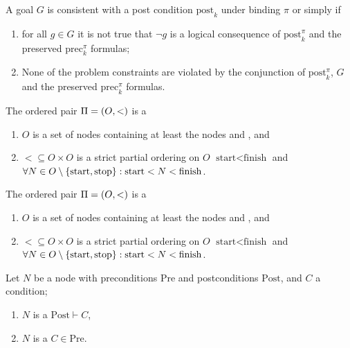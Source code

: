 \begin{defi}
A goal $G$ is consistent with a post condition $\mbox{post}_k$ under binding $\pi$ or simply  if
\begin{enumerate}
 \item for all $g\in G$ it is not true that $\neg g$ is a logical consequence of $\mbox{post}_k^{\pi}$ and the preserved $\mbox{prec}_k^{\pi}$ formulas;
 \item None of the problem constraints are violated by the conjunction of $\mbox{post}_k^{\pi}$, $G$ and the preserved $\mbox{prec}_k^{\pi}$ formulas.
\end{enumerate}
\cite{conf/ijcai/ChengI89}
\end{defi}

\begin{defi}
The ordered pair $\Pi=\left( O,<\right)$ is a  \iffTx{}
\begin{enumerate}
 \item $O$ is a set of nodes containing at least the nodes  and , and
 \item $<\subseteq O\times O$ is a strict partial ordering on $O$ \stTx{} $\mbox{start}<\mbox{finish}$ and $\forall N\in O\setminus\left\{ \mbox{start},\mbox{stop}\right\}:\mbox{start}<N<\mbox{finish}$.
\end{enumerate}
\cite{conf/ijcai/HertzbergH89}
\end{defi}

\begin{defi}
The ordered pair $\Pi=\left( O,<\right)$ is a  \iffTx{}
\begin{enumerate}
 \item $O$ is a set of nodes containing at least the nodes  and , and
 \item $<\subseteq O\times O$ is a strict partial ordering on $O$ \stTx{} $\mbox{start}<\mbox{finish}$ and $\forall N\in O\setminus\left\{ \mbox{start},\mbox{stop}\right\}:\mbox{start}<N<\mbox{finish}$.
\end{enumerate}
\cite{conf/ijcai/HertzbergH89}
\end{defi}

\begin{defi}
Let $N$ be a node with preconditions $\mbox{Pre}$ and postconditions $\mbox{Post}$, and $C$ a condition;
\begin{enumerate}
 \item $N$ is a  \iffTx{} $\mbox{Post}\vdash C$,
 \item $N$ is a  \iffTx{} $C\in\mbox{Pre}$.
\end{enumerate}
\cite{conf/ijcai/HertzbergH89}
\end{defi}

